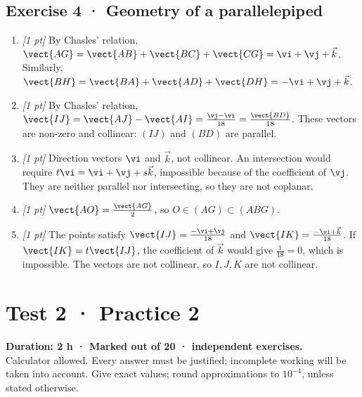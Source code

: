 \subsection*{Exercise 4 · Geometry of a parallelepiped}\begin{enumerate}

\item \textit{[1 pt]} By Chasles' relation, $\vect{AG}=\vect{AB}+\vect{BC}+\vect{CG}=\vi +\vj +\vec k$. Similarly, $\vect{BH}=\vect{BA}+\vect{AD}+\vect{DH}=-\vi +\vj +\vec k$.

\item \textit{[1 pt]} By Chasles' relation, $\vect{IJ}=\vect{AJ}-\vect{AI}=\frac{\vj -\vi }{18}=\frac{\vect{BD}}{18}$. These vectors are non-zero and collinear: $(IJ)$ and $(BD)$ are parallel.

\item \textit{[1 pt]} Direction vectors $\vi $ and $\vec k$, not collinear. An intersection would require $t\vi =\vi +\vj +s\vec k$, impossible because of the coefficient of $\vj $. They are neither parallel nor intersecting, so they are not coplanar.

\item \textit{[1 pt]} $\vect{AO}=\frac{\vect{AG}}{2}$, so $O\in(AG)\subset(ABG)$.

\item \textit{[1 pt]} The points satisfy $\vect{IJ}=\frac{-\vi +\vj }{18}$ and $\vect{IK}=\frac{-\vi +\vec k}{18}$. If $\vect{IK}=t\vect{IJ}$, the coefficient of $\vec k$ would give $\frac{1}{18}=0$, which is impossible. The vectors are not collinear, so $I,J,K$ are not collinear.

\end{enumerate}

\fi

\mxnewpage{}\label{sujet:2-2}

\section*{Test 2 · Practice 2}


\textbf{Duration: 2 h · Marked out of 20 ·  independent exercises.}\\Calculator allowed. Every answer must be justified; incomplete working will be taken into account. Give exact values; round approximations to $10^{-4}$, unless stated otherwise.

